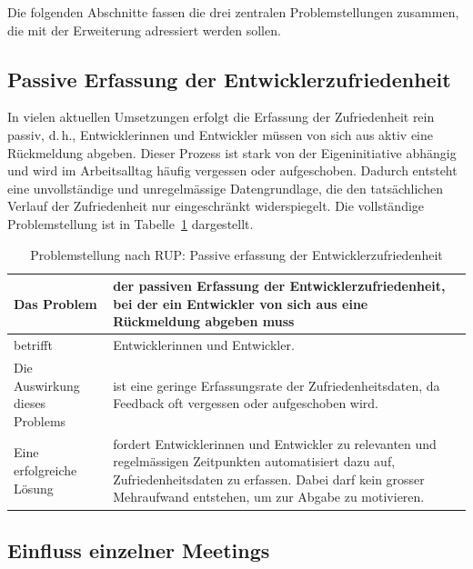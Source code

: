 \documentclass[12pt,a4paper]{report}
\begin{document}
Die folgenden Abschnitte fassen die drei zentralen Problemstellungen zusammen, die mit der Erweiterung adressiert werden sollen.

\subsection{Passive Erfassung der Entwicklerzufriedenheit}

In vielen aktuellen Umsetzungen erfolgt die Erfassung der Zufriedenheit rein passiv, d.\,h., Entwicklerinnen und Entwickler
müssen von sich aus aktiv eine Rückmeldung abgeben. Dieser Prozess ist stark von der Eigeninitiative abhängig und wird im
Arbeitsalltag häufig vergessen oder aufgeschoben. Dadurch entsteht eine unvollständige und unregelmässige Datengrundlage, die den
tatsächlichen Verlauf der Zufriedenheit nur eingeschränkt widerspiegelt. Die vollständige Problemstellung ist in 
Tabelle~\ref{tab:rup-passive} dargestellt.

\begin{table}[H]
  \caption{Problemstellung nach RUP: Passive erfassung der Entwicklerzufriedenheit}
  \label{tab:rup-passive}
  \centering
  \begin{tabularx}{\textwidth}{>{\raggedright\arraybackslash}p{}|X}
    \hline
    Das Problem & der passiven Erfassung der Entwicklerzufriedenheit,
    bei der ein Entwickler von sich aus eine Rückmeldung abgeben muss \\ \hline

    betrifft & Entwicklerinnen und Entwickler. \\ \hline

    Die Auswirkung dieses Problems & ist eine geringe Erfassungsrate der Zufriedenheitsdaten,
    da Feedback oft vergessen oder aufgeschoben wird. \\ \hline

    Eine erfolgreiche Lösung & fordert Entwicklerinnen und Entwickler zu relevanten
    und regelmässigen Zeitpunkten automatisiert dazu auf, Zufriedenheitsdaten zu erfassen.
    Dabei darf kein grosser Mehraufwand entstehen, um zur Abgabe zu motivieren. \\ \hline
  \end{tabularx}
\end{table}

\subsection{Einfluss einzelner Meetings}
\end{document}
